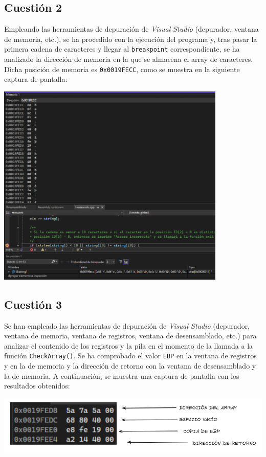 \documentclass[11pt,a4paper]{article}
\begin{document}
\subsection{Cuestión 2}
Empleando las herramientas de depuración de \textit{Visual Studio} (depurador, ventana de memoria, etc.), se ha procedido con la ejecución del programa y, tras pasar la primera cadena de caracteres y llegar al \texttt{breakpoint} correspondiente, se ha analizado la dirección de memoria en la que se almacena el array de caracteres. Dicha posición de memoria es \texttt{0x0019FECC}, como se muestra en la siguiente captura de pantalla: \vspace{2ex}
\begin{center}
  \includegraphics[width=0.82\textwidth]{direccionMemoriaCWRS.png}
\end{center}
\vspace{3ex}

\subsection{Cuestión 3}
Se han empleado las herramientas de depuración de \textit{Visual Studio} (depurador, ventana de memoria, ventana de registros, ventana de desensamblado, etc.) para analizar el contenido de los registros y la pila en el momento de la llamada a la función \texttt{CheckArray()}. Se ha comprobado el valor \texttt{EBP} en la ventana de registros y en la de memoria y la dirección de retorno con la ventana de desensamblado y la de memoria. A continuación, se muestra una captura de pantalla con los resultados obtenidos:
\begin{center}
  \includegraphics[width=1\textwidth]{retornoFuncion2.png}
\end{center}
\end{document}
